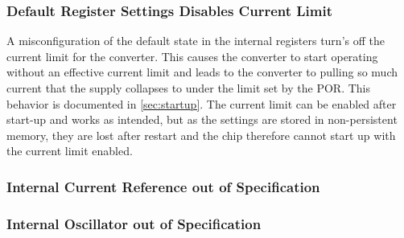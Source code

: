 \subsubsection{Default Register Settings Disables Current Limit}

A misconfiguration of the default state in the internal registers turn's off the current limit for the converter. This causes the converter to start operating without an effective current limit and leads to the converter to pulling so much current that the supply collapses to under the limit set by the \ac{POR}. This behavior is documented in \autoref{sec:startup}. The current limit can be enabled after start-up and works as intended, but as the settings are stored in non-persistent memory, they are lost after restart and the chip therefore cannot start up with the current limit enabled. 


\subsubsection{Internal Current Reference out of Specification}

\subsubsection{Internal Oscillator out of Specification}